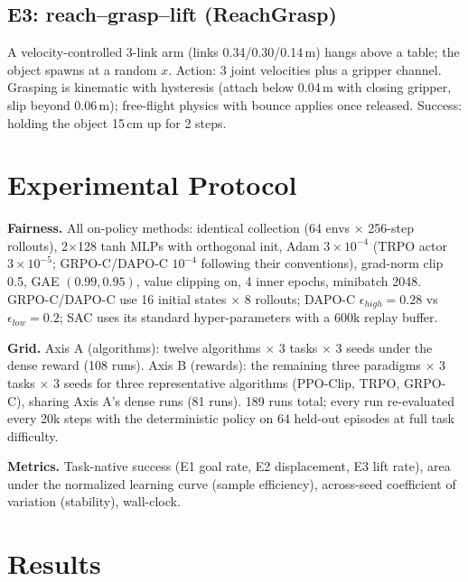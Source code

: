 \documentclass[journal,twoside]{IEEEtran}
\newcommand{\ppo}{\textsc{PPO}}
\newcommand{\trpo}{\textsc{TRPO}}
\newcommand{\grpo}{\textsc{GRPO-C}}
\newcommand{\dapo}{\textsc{DAPO-C}}
\begin{document}
\subsection{E3: reach--grasp--lift (ReachGrasp)}
A velocity-controlled 3-link arm (links 0.34/0.30/0.14\,m) hangs above a
table; the object spawns at a random $x$. Action: 3 joint velocities plus a
gripper channel. Grasping is kinematic with hysteresis (attach below
0.04\,m with closing gripper, slip beyond 0.06\,m); free-flight physics
with bounce applies once released. Success: holding the object 15\,cm up
for 2 steps.

\section{Experimental Protocol}
\label{sec:protocol}
\textbf{Fairness.} All on-policy methods: identical collection (64 envs
$\times$ 256-step rollouts), 2$\times$128 tanh MLPs with orthogonal init,
Adam $3{\times}10^{-4}$ (TRPO actor $3{\times}10^{-5}$; \grpo{}/\dapo{}
$10^{-4}$ following their conventions), grad-norm clip 0.5, GAE
$(0.99,0.95)$, value clipping on, 4 inner epochs, minibatch 2048.
\grpo{}/\dapo{} use 16 initial states $\times$ 8 rollouts; \dapo{}
$\epsilon_{high}{=}0.28$ vs $\epsilon_{low}{=}0.2$; SAC uses its standard
hyper-parameters with a $600$k replay buffer.

\textbf{Grid.} Axis A (algorithms): twelve algorithms $\times$ 3 tasks
$\times$ 3 seeds under the dense reward (108 runs). Axis B (rewards): the
remaining three paradigms $\times$ 3 tasks $\times$ 3 seeds for three
representative algorithms (\ppo{}-Clip, \trpo{}, \grpo{}), sharing Axis
A's dense runs (81 runs). 189 runs total; every run re-evaluated
every 20k steps with the deterministic policy on 64 held-out episodes at
full task difficulty.

\textbf{Metrics.} Task-native success (E1 goal rate, E2 displacement,
E3 lift rate), area under the normalized learning curve (sample
efficiency), across-seed coefficient of variation (stability), wall-clock.

\section{Results}
\label{sec:results}
\end{document}

